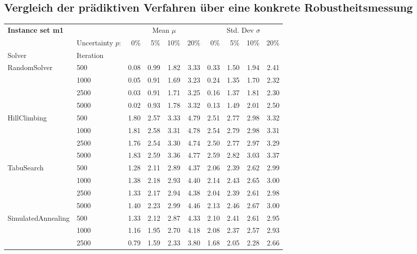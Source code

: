 \subsection{Vergleich der prädiktiven Verfahren über eine konkrete Robustheitsmessung}

{\footnotesize
\begin{longtable}{ll|rrrr|rrrr}
\toprule
\textbf{Instance set m1}                 & {} & \multicolumn{4}{c|}{Mean $\mu$} & \multicolumn{4}{c}{Std. Dev $\sigma$} \\
                & Uncertainty $p$: & 0\% & 5\% & 10\% & 20\% & 0\% & 5\% & 10\% & 20\% \\
Solver & Iteration &      &      &      &      &      &      &      &      \\
\midrule
RandomSolver & 500  & 0.08 & 0.99 & 1.82 & 3.33 & 0.33 & 1.50 & 1.94 & 2.41 \\
                 & 1000 & 0.05 & 0.91 & 1.69 & 3.23 & 0.24 & 1.35 & 1.70 & 2.32 \\
                 & 2500 & 0.03 & 0.91 & 1.71 & 3.25 & 0.16 & 1.37 & 1.81 & 2.30 \\
                 & 5000 & 0.02 & 0.93 & 1.78 & 3.32 & 0.13 & 1.49 & 2.01 & 2.50 \\ \hline
HillClimbing & 500  & 1.80 & 2.57 & 3.33 & 4.79 & 2.51 & 2.77 & 2.98 & 3.32 \\
                 & 1000 & 1.81 & 2.58 & 3.31 & 4.78 & 2.54 & 2.79 & 2.98 & 3.31 \\
                 & 2500 & 1.76 & 2.54 & 3.30 & 4.74 & 2.50 & 2.77 & 2.97 & 3.29 \\
                 & 5000 & 1.83 & 2.59 & 3.36 & 4.77 & 2.59 & 2.82 & 3.03 & 3.37 \\ \hline
TabuSearch & 500  & 1.28 & 2.11 & 2.89 & 4.37 & 2.06 & 2.39 & 2.62 & 2.99 \\
                 & 1000 & 1.38 & 2.18 & 2.93 & 4.40 & 2.14 & 2.43 & 2.65 & 3.00 \\
                 & 2500 & 1.33 & 2.17 & 2.94 & 4.38 & 2.04 & 2.39 & 2.61 & 2.98 \\
                 & 5000 & 1.40 & 2.23 & 2.99 & 4.46 & 2.13 & 2.46 & 2.67 & 3.00 \\ \hline
SimulatedAnnealing & 500  & 1.33 & 2.12 & 2.87 & 4.33 & 2.10 & 2.41 & 2.61 & 2.95 \\
                 & 1000 & 1.16 & 1.95 & 2.70 & 4.18 & 2.08 & 2.37 & 2.57 & 2.93 \\
                 & 2500 & 0.79 & 1.59 & 2.33 & 3.80 & 1.68 & 2.05 & 2.28 & 2.66 \\

\end{longtable}}
